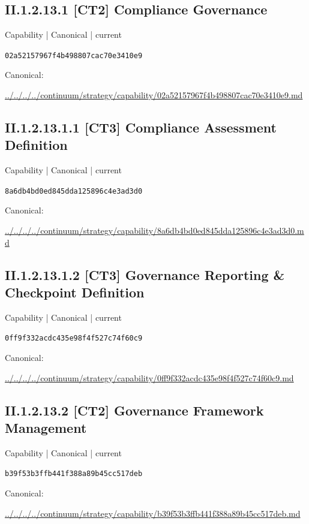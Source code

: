 \documentclass[10pt,a4paper]{article}
\begin{document}
\subsection*{II.1.2.13.1 [CT2] Compliance Governance}
\label{element-02a52157967f4b498807cac70e3410e9}
{\small Capability | Canonical | current}\par
\texttt{02a52157967f4b498807cac70e3410e9}\par
Canonical: \par
{\footnotesize\url{../../../../continuum/strategy/capability/02a52157967f4b498807cac70e3410e9.md}}\par
\subsection*{II.1.2.13.1.1 [CT3] Compliance Assessment Definition}
\label{element-8a6db4bd0ed845dda125896c4e3ad3d0}
{\small Capability | Canonical | current}\par
\texttt{8a6db4bd0ed845dda125896c4e3ad3d0}\par
Canonical: \par
{\footnotesize\url{../../../../continuum/strategy/capability/8a6db4bd0ed845dda125896c4e3ad3d0.md}}\par
\subsection*{II.1.2.13.1.2 [CT3] Governance Reporting \& Checkpoint Definition}
\label{element-0ff9f332acdc435e98f4f527c74f60c9}
{\small Capability | Canonical | current}\par
\texttt{0ff9f332acdc435e98f4f527c74f60c9}\par
Canonical: \par
{\footnotesize\url{../../../../continuum/strategy/capability/0ff9f332acdc435e98f4f527c74f60c9.md}}\par
\subsection*{II.1.2.13.2 [CT2] Governance Framework Management}
\label{element-b39f53b3ffb441f388a89b45cc517deb}
{\small Capability | Canonical | current}\par
\texttt{b39f53b3ffb441f388a89b45cc517deb}\par
Canonical: \par
{\footnotesize\url{../../../../continuum/strategy/capability/b39f53b3ffb441f388a89b45cc517deb.md}}\par
\end{document}
